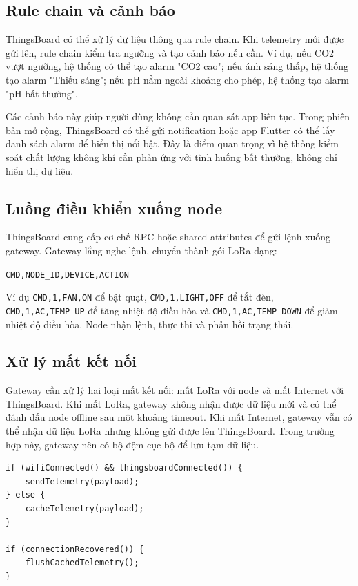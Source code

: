 \subsection{Rule chain và cảnh báo}
ThingsBoard có thể xử lý dữ liệu thông qua rule chain. Khi telemetry mới được gửi lên, rule chain kiểm tra ngưỡng và tạo cảnh báo nếu cần. Ví dụ, nếu CO2 vượt ngưỡng, hệ thống có thể tạo alarm "CO2 cao"; nếu ánh sáng thấp, hệ thống tạo alarm "Thiếu sáng"; nếu pH nằm ngoài khoảng cho phép, hệ thống tạo alarm "pH bất thường".

Các cảnh báo này giúp người dùng không cần quan sát app liên tục. Trong phiên bản mở rộng, ThingsBoard có thể gửi notification hoặc app Flutter có thể lấy danh sách alarm để hiển thị nổi bật. Đây là điểm quan trọng vì hệ thống kiểm soát chất lượng không khí cần phản ứng với tình huống bất thường, không chỉ hiển thị dữ liệu.

\subsection{Luồng điều khiển xuống node}
ThingsBoard cung cấp cơ chế RPC hoặc shared attributes để gửi lệnh xuống gateway. Gateway lắng nghe lệnh, chuyển thành gói LoRa dạng:
\begin{center}
\texttt{CMD,NODE\_ID,DEVICE,ACTION}
\end{center}
Ví dụ \texttt{CMD,1,FAN,ON} để bật quạt, \texttt{CMD,1,LIGHT,OFF} để tắt đèn, \texttt{CMD,1,AC,TEMP\_UP} để tăng nhiệt độ điều hòa và \texttt{CMD,1,AC,TEMP\_DOWN} để giảm nhiệt độ điều hòa. Node nhận lệnh, thực thi và phản hồi trạng thái.

\subsection{Xử lý mất kết nối}
Gateway cần xử lý hai loại mất kết nối: mất LoRa với node và mất Internet với ThingsBoard. Khi mất LoRa, gateway không nhận được dữ liệu mới và có thể đánh dấu node offline sau một khoảng timeout. Khi mất Internet, gateway vẫn có thể nhận dữ liệu LoRa nhưng không gửi được lên ThingsBoard. Trong trường hợp này, gateway nên có bộ đệm cục bộ để lưu tạm dữ liệu.

\begin{lstlisting}[caption={Mã giả xử lý gửi telemetry tại gateway}]
if (wifiConnected() && thingsboardConnected()) {
    sendTelemetry(payload);
} else {
    cacheTelemetry(payload);
}

if (connectionRecovered()) {
    flushCachedTelemetry();
}
\end{lstlisting}
